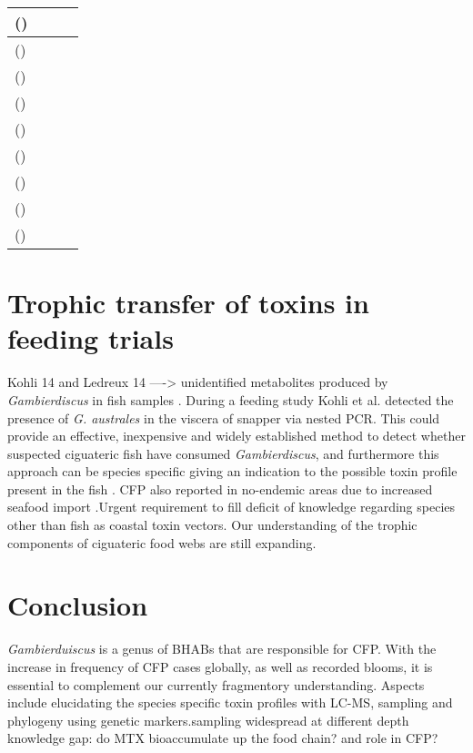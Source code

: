 \documentclass[12pt]{article}
\begin{document}
\begin{longtable}{  | p{3cm} | p{4.5cm} | p{2.95cm} | p{3.95cm} | }
\hline
   \emph{} () &  &  & \\
\hline
  \emph{} () &  &  & \\
\hline
   \emph{} () &  &  & \\
\hline
  \emph{} ()  &  &  & \\
\hline
  \emph{} ()  &  &  & \\
\hline
  \emph{} ()  &  &  & \\
\hline
  \emph{} () &  &  & \\
\hline
   \emph{} () &  &  & \\
\hline
  \emph{} ()  &  &  & \\
\hline
\end{longtable}

\FloatBarrier

\section{Trophic transfer of toxins in feeding trials}
Kohli 14 and Ledreux 14
----> unidentified metabolites produced by \emph{Gambierdiscus} in fish samples \cite{endean1993variation,vernoux1997isolation}.
During a feeding study Kohli et al. detected the presence of \emph{G. australes} in the viscera of snapper via nested PCR. This could provide an effective, inexpensive and widely established method to detect whether suspected ciguateric fish have consumed \emph{Gambierdiscus}, and furthermore this approach can be species specific giving an indication to the possible toxin profile present in the fish \cite{kohli2014feeding}.
CFP also reported in no-endemic areas due to increased seafood import \cite{glaziou1994epidemiology,ting2001ciguatera}.Urgent requirement to fill deficit of knowledge regarding species other than fish as coastal toxin vectors. 
Our understanding of the trophic components of ciguateric food webs are still expanding.

\section{Conclusion}
\emph{Gambierduiscus} is a genus of BHABs that are responsible for CFP. With the increase in frequency of CFP cases globally, as well as recorded blooms, it is essential to complement our currently fragmentory understanding. Aspects include elucidating the species specific toxin profiles with LC-MS, sampling and phylogeny using genetic markers.sampling widespread at different depth 
knowledge gap: do MTX bioaccumulate up the food chain? and role in CFP?
\newpage



\end{document}
